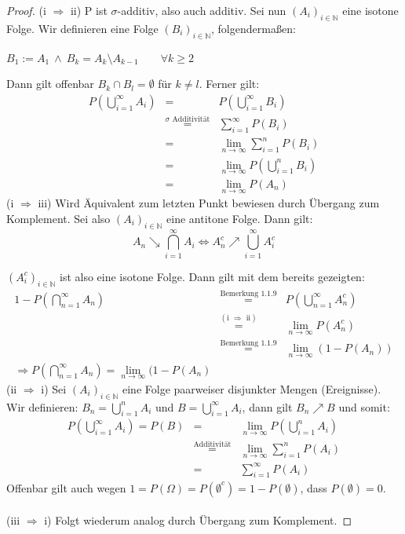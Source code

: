 \documentclass[10pt,a4paper]{report}
\numberwithin{equation}{section}
\numberwithin{figure}{section}
\theoremstyle{plain}
\theoremstyle{definition}
\theoremstyle{remark}
\theoremstyle{plain}
\newcommand{\1}{ \mathbb{1} } %
\begin{document}
\begin{proof}
  (i $\Rightarrow$ ii) P ist $\sigma$-additiv, also auch additiv. Sei
  nun $(A_i)_{i \in \mathbb{N}}$ eine isotone Folge. Wir definieren
  eine Folge $(B_i)_{i \in \mathbb{N}}$, folgendermaßen:
  \begin{center}
    $B_1:=A_1 ~\wedge~ B_k=A_k\setminus A_{k-1} \qquad \forall k \geq
    2 $
  \end{center}
  Dann gilt offenbar $B_k\cap B_l=\emptyset$ für $k\neq l$. Ferner
  gilt:
  \begin{eqnarray*}
    P\left(\bigcup\limits_{i=1}^\infty A_i\right)&=&P\left(\bigcup\limits_{i=1}^\infty B_i\right)\\
    &\overset{\sigma \text{ Additivität}}{=}&\sum\limits_{i=1}^\infty P(B_i)\\
    &=& \lim\limits_{n \to \infty}\sum\limits_{i=1}^n P(B_i)\\ 
    &=& \lim\limits_{n \to \infty} P\left(\bigcup\limits_{i=1}^n B_i\right)\\
    &=& \lim\limits_{n \to \infty} P(A_n)
  \end{eqnarray*}
  (i $\Rightarrow$ iii) Wird Äquivalent zum letzten Punkt bewiesen
  durch Übergang zum Komplement. Sei also $(A_i)_{i \in \mathbb{N}}$
  eine antitone Folge. Dann gilt:
\[A_n \searrow
    \bigcap\limits_{i=1}^\infty A_i \Leftrightarrow A_n^c \nearrow
    \bigcup\limits_{i=1}^\infty A_i^c\]

  $(A_i^c)_{i \in \mathbb{N}}$ ist also eine isotone Folge. Dann gilt
  mit dem bereits gezeigten:
  \begin{eqnarray*}
    1-P\left(\bigcap\limits_{n=1}^\infty A_n\right)&\overset{\text{Bemerkung 1.1.9}}{=}&P\left(\bigcup\limits_{n=1}^\infty A_n^c\right)\\
    &\overset{(\text{i } \Rightarrow \text{ ii})}{=}&\lim\limits_{n \to \infty}P(A_n^c)\\
    &\overset{\text{Bemerkung 1.1.9}}{=}&\lim\limits_{n \to \infty}(1-P(A_n))\\
    \Rightarrow P\left(\bigcap\limits_{n=1}^\infty A_n\right)=\lim\limits_{n \to \infty}(1-P(A_n)
  \end{eqnarray*} 
  (ii $\Rightarrow$ i) Sei $(A_i)_{i\in \mathbb{N}}$ eine Folge
  paarweiser disjunkter Mengen (Ereignisse). Wir definieren:
  $B_n=\bigcup\limits_{i=1}^n A_i$ und $B=\bigcup\limits_{i=1}^\infty
  A_i$, dann gilt $B_n \nearrow B$ und somit:
  \begin{eqnarray*}
    P\left(\bigcup\limits_{i=1}^\infty A_i\right)=P(B)&=&\lim\limits_{n \to \infty}P\left(\bigcup\limits_{i=1}^n A_i\right)\\
    &\overset{\text{Additivität}}{=}& \lim\limits_{n \to \infty}\sum\limits_{i=1}^n P(A_i)\\
    &=& \sum\limits_{i=1}^\infty P(A_i)
  \end{eqnarray*} 
  Offenbar gilt auch wegen $1=P(\Omega)=P(\emptyset^c)=1-P(\emptyset)$, dass $P(\emptyset)=0$.\\\\
  (iii $\Rightarrow$ i) Folgt wiederum analog durch Übergang zum
  Komplement.
\end{proof}
\end{document}
